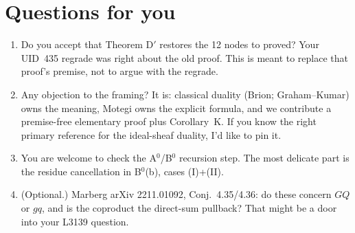 \documentclass[11pt]{article}
\newcommand{\gr}[1]{\textsf{#1}}
\theoremstyle{remark}
\begin{document}
\section*{Questions for you}
\begin{enumerate}[leftmargin=*,itemsep=2pt]
\item Do you accept that Theorem D$'$ restores the 12 nodes to \gr{proved}? Your UID~435 regrade was right
  about the old proof. This is meant to replace that proof's premise, not to argue with the regrade.
\item Any objection to the framing? It is: classical duality (Brion; Graham--Kumar) owns the meaning, Motegi owns the
  explicit formula, and we contribute a premise-free elementary proof plus Corollary~K. If you know the right primary
  reference for the ideal-sheaf duality, I'd like to pin it.
\item You are welcome to check the A$^0$/B$^0$ recursion step. The most delicate part is the residue cancellation in
  B$^0$(b), cases (I)+(II).
\item (Optional.) Marberg arXiv 2211.01092, Conj.~4.35/4.36: do these concern $GQ$ or $gq$, and is the coproduct
  the direct-sum pullback? That might be a door into your L3139 question.
\end{enumerate}
\end{document}

